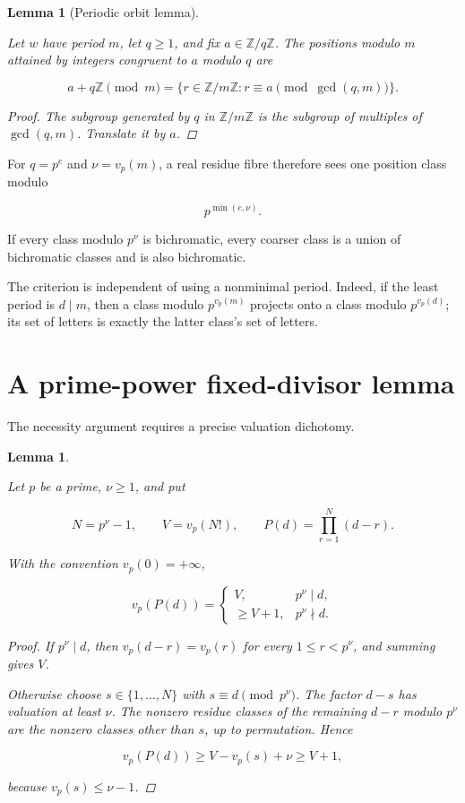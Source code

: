 \documentclass[11pt]{article}
\newtheorem{lemma}[theorem]{Lemma}
\numberwithin{equation}{section}
\begin{document}
\begin{lemma}[Periodic orbit lemma]
\label{lem:orbit}

Let $w$ have period $m$, let $q\ge1$, and fix
$a\in\mathbb Z/q\mathbb Z$. The positions modulo $m$ attained by integers
congruent to $a$ modulo $q$ are

\[
a+q\mathbb Z\pmod m
=\{r\in\mathbb Z/m\mathbb Z:r\equiv a
  \pmod{\gcd(q,m)}\}.
\]

\begin{proof}

The subgroup generated by $q$ in $\mathbb Z/m\mathbb Z$ is the subgroup of
multiples of $\gcd(q,m)$. Translate it by $a$.
\end{proof}

\end{lemma}


For $q=p^e$ and $\nu=v_p(m)$, a real residue fibre therefore sees one
position class modulo

\[
p^{\min(e,\nu)}.
\]

If every class modulo $p^\nu$ is bichromatic, every coarser class is a union
of bichromatic classes and is also bichromatic.

The criterion is independent of using a nonminimal period. Indeed, if the
least period is $d\mid m$, then a class modulo $p^{v_p(m)}$ projects onto a
class modulo $p^{v_p(d)}$; its set of letters is exactly the latter class's
set of letters.

\section{A prime-power fixed-divisor lemma}


The necessity argument requires a precise valuation dichotomy.

\begin{lemma}
\label{lem:fixed-divisor}

Let $p$ be a prime, $\nu\ge1$, and put

\[
N=p^\nu-1,
\qquad
V=v_p(N!),
\qquad
P(d)=\prod_{r=1}^{N}(d-r).
\]

With the convention $v_p(0)=+\infty$,

\[
v_p(P(d))=
\begin{cases}
V,&p^\nu\mid d,\\
\ge V+1,&p^\nu\nmid d.
\end{cases}
\]

\begin{proof}

If $p^\nu\mid d$, then $v_p(d-r)=v_p(r)$ for every
$1\le r<p^\nu$, and summing gives $V$.

Otherwise choose $s\in\{1,\ldots,N\}$ with
$s\equiv d\pmod {p^\nu}$. The factor $d-s$ has valuation at least $\nu$.
The nonzero residue classes of the remaining $d-r$ modulo $p^\nu$ are the
nonzero classes other than $s$, up to permutation. Hence

\[
v_p(P(d))\ge V-v_p(s)+\nu\ge V+1,
\]

because $v_p(s)\le\nu-1$.
\end{proof}

\end{lemma}
\end{document}
